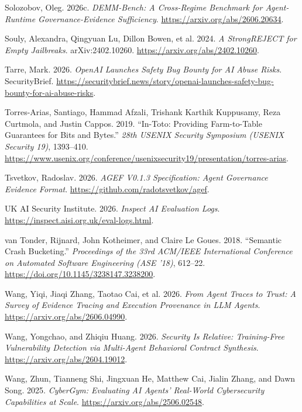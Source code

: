 \documentclass[
  american,
  10pt,
  a4paper,
]{article}
\newlength{\cslhangindent}
\newenvironment{CSLReferences}[2] %
 {\begin{list}{}{%
  \setlength{\itemindent}{0pt}
  \setlength{\leftmargin}{0pt}
  \setlength{\parsep}{0pt}
  \ifodd #1
   \setlength{\leftmargin}{\cslhangindent}
   \setlength{\itemindent}{-1\cslhangindent}
  \fi
  \setlength{\itemsep}{#2\baselineskip}}}
 {\end{list}}
\begin{document}
\begin{CSLReferences}{1}{1}
Solozobov, Oleg. 2026c. \emph{{DEMM-Bench}: A Cross-Regime Benchmark for
Agent-Runtime Governance-Evidence Sufficiency}.
\url{https://arxiv.org/abs/2606.20634}.

Souly, Alexandra, Qingyuan Lu, Dillon Bowen, et al. 2024. \emph{A
{StrongREJECT} for Empty Jailbreaks}. arXiv:2402.10260.
\url{https://arxiv.org/abs/2402.10260}.

Tarre, Mark. 2026. \emph{{OpenAI} Launches Safety Bug Bounty for {AI}
Abuse Risks}. SecurityBrief.
\url{https://securitybrief.news/story/openai-launches-safety-bug-bounty-for-ai-abuse-risks}.

Torres-Arias, Santiago, Hammad Afzali, Trishank Karthik Kuppusamy, Reza
Curtmola, and Justin Cappos. 2019. {``In-Toto: Providing Farm-to-Table
Guarantees for Bits and Bytes.''} \emph{28th USENIX Security Symposium
(USENIX Security 19)}, 1393--410.
\url{https://www.usenix.org/conference/usenixsecurity19/presentation/torres-arias}.

Tsvetkov, Radoslav. 2026. \emph{{AGEF} V0.1.3 Specification: Agent
Governance Evidence Format}. \url{https://github.com/radotsvetkov/agef}.

UK AI Security Institute. 2026. \emph{Inspect AI Evaluation Logs}.
\url{https://inspect.aisi.org.uk/eval-logs.html}.

{van Tonder, Rijnard, John Kotheimer, and Claire Le Goues}. 2018.
{``Semantic Crash Bucketing.''} \emph{Proceedings of the 33rd ACM/IEEE
International Conference on Automated Software Engineering (ASE '18)},
612--22. \url{https://doi.org/10.1145/3238147.3238200}.

Wang, Yiqi, Jiaqi Zhang, Taotao Cai, et al. 2026. \emph{From Agent
Traces to Trust: A Survey of Evidence Tracing and Execution Provenance
in LLM Agents}. \url{https://arxiv.org/abs/2606.04990}.

Wang, Yongchao, and Zhiqiu Huang. 2026. \emph{Security Is Relative:
Training-Free Vulnerability Detection via Multi-Agent Behavioral
Contract Synthesis}. \url{https://arxiv.org/abs/2604.19012}.

Wang, Zhun, Tianneng Shi, Jingxuan He, Matthew Cai, Jialin Zhang, and
Dawn Song. 2025. \emph{{CyberGym}: Evaluating {AI} Agents' Real-World
Cybersecurity Capabilities at Scale}.
\url{https://arxiv.org/abs/2506.02548}.


\end{CSLReferences}
\end{document}
